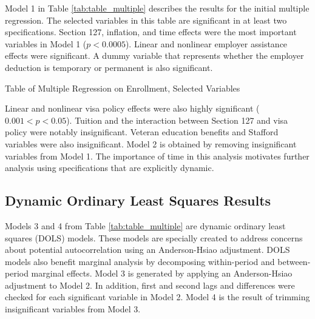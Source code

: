 \documentclass[review]{elsarticle}
\begin{document}
Model 1 in Table \ref{tab:table_multiple} describes the results for the initial multiple regression.
The selected variables in this table are significant in at least two specifications.
Section 127, inflation, and time effects were the most important variables in Model 1 ($p < 0.0005$).
Linear and nonlinear employer assistance effects were significant.
A dummy variable that represents whether the employer deduction is temporary or permanent is also significant.

\begin{table}
    \caption{Table of Multiple Regression on Enrollment, Selected Variables}
    \resizebox{\columnwidth}{!}{
        
    }
    \label{tab:table_multiple}
\end{table}

Linear and nonlinear visa policy effects were also highly significant ($0.001 < p < 0.05$).
Tuition and the interaction between Section 127 and visa policy were notably insignificant.
Veteran education benefits and Stafford variables were also insignificant.
Model 2 is obtained by removing insignificant variables from Model 1.
The importance of time in this analysis motivates further analysis using specifications that are explicitly dynamic.

\subsection{Dynamic Ordinary Least Squares Results}

Models 3 and 4 from Table \ref{tab:table_multiple} are dynamic ordinary least squares (DOLS) models.
These models are specially created to address concerns about potential autocorrelation using an Anderson-Hsiao adjustment\cite{anderson1981estimation}.
DOLS models also benefit marginal analysis by decomposing within-period and between-period marginal effects.
Model 3 is generated by applying an Anderson-Hsiao adjustment to Model 2.
In addition, first and second lags and differences were checked for each significant variable in Model 2.
Model 4 is the result of trimming insignificant variables from Model 3.
\end{document}
